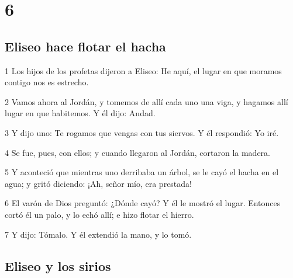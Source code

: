 \chapter{6}

\section*{Eliseo hace flotar el hacha}

\par 1 Los hijos de los profetas dijeron a Eliseo: He aquí, el lugar en que moramos contigo nos es estrecho.
\par 2 Vamos ahora al Jordán, y tomemos de allí cada uno una viga, y hagamos allí lugar en que habitemos. Y él dijo: Andad.
\par 3 Y dijo uno: Te rogamos que vengas con tus siervos. Y él respondió: Yo iré.
\par 4 Se fue, pues, con ellos; y cuando llegaron al Jordán, cortaron la madera.
\par 5 Y aconteció que mientras uno derribaba un árbol, se le cayó el hacha en el agua; y gritó diciendo: ¡Ah, señor mío, era prestada!
\par 6 El varón de Dios preguntó: ¿Dónde cayó? Y él le mostró el lugar. Entonces cortó él un palo, y lo echó allí; e hizo flotar el hierro.
\par 7 Y dijo: Tómalo. Y él extendió la mano, y lo tomó.

\section*{Eliseo y los sirios}


